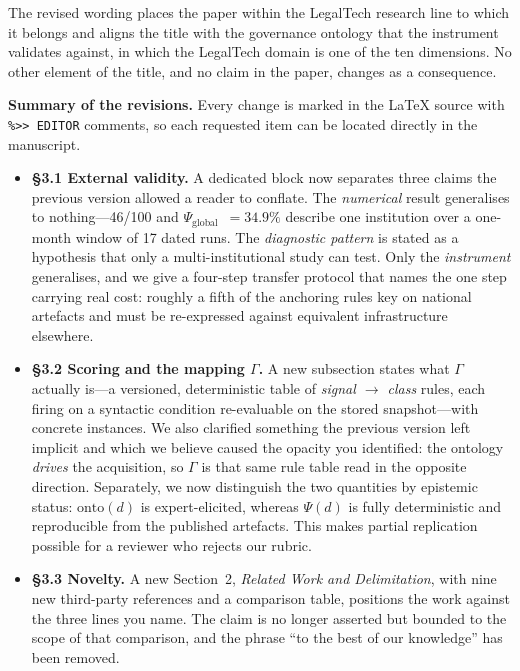 \documentclass[11pt,a4paper]{article}
\newcommand{\Psiglob}{$\Psi_{\mathrm{global}}$}
\begin{document}
\vspace{2pt}
The revised wording places the paper within the LegalTech research line to which it belongs and aligns the title with the governance ontology that the instrument validates against, in which the LegalTech domain is one of the ten dimensions. No other element of the title, and no claim in the paper, changes as a consequence.

\vspace{6pt}
\textbf{Summary of the revisions.}
Every change is marked in the \LaTeX{} source with \verb|%>> EDITOR| comments, so each requested item can be located directly in the manuscript.

\begin{itemize}
  \item \textbf{§3.1 External validity.} A dedicated block now separates three claims the previous version allowed a reader to conflate. The \emph{numerical} result generalises to nothing---46/100 and \Psiglob{}~$=34.9\%$ describe one institution over a one-month window of 17 dated runs. The \emph{diagnostic pattern} is stated as a hypothesis that only a multi-institutional study can test. Only the \emph{instrument} generalises, and we give a four-step transfer protocol that names the one step carrying real cost: roughly a fifth of the anchoring rules key on national artefacts and must be re-expressed against equivalent infrastructure elsewhere.
  \item \textbf{§3.2 Scoring and the mapping $\Gamma$.} A new subsection states what $\Gamma$ actually is---a versioned, deterministic table of \emph{signal $\rightarrow$ class} rules, each firing on a syntactic condition re-evaluable on the stored snapshot---with concrete instances. We also clarified something the previous version left implicit and which we believe caused the opacity you identified: the ontology \emph{drives} the acquisition, so $\Gamma$ is that same rule table read in the opposite direction. Separately, we now distinguish the two quantities by epistemic status: $\mathrm{onto}(d)$ is expert-elicited, whereas $\Psi(d)$ is fully deterministic and reproducible from the published artefacts. This makes partial replication possible for a reviewer who rejects our rubric.
  \item \textbf{§3.3 Novelty.} A new Section~2, \emph{Related Work and Delimitation}, with nine new third-party references and a comparison table, positions the work against the three lines you name. The claim is no longer asserted but bounded to the scope of that comparison, and the phrase ``to the best of our knowledge'' has been removed.

\end{itemize}
\end{document}
